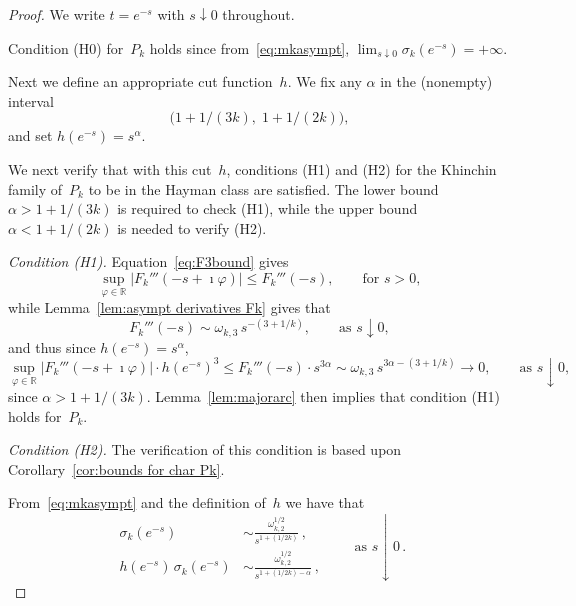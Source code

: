 \documentclass[12pt]{amsart}
\theoremstyle{definition}
\begin{document}
\begin{proof}
We write $t=e^{-s}$ with $s\downarrow 0$ throughout.

Condition (H0) for~$P_k$ holds since from~\eqref{eq:mkasympt}, $\lim_{s\downarrow 0}\sigma_k(e^{-s})=+\infty$.

Next we define an appropriate cut function~$h$. We fix any $\alpha$ in the (nonempty) interval
\begin{equation}\label{eq:alphainterval}
\big(1+1/(3k),\; 1+1/(2k)\big),
\end{equation}
and set $h(e^{-s})=s^{\alpha}$.
\smallskip

We next verify that with this cut~$h$, conditions (H1) and (H2) for the Khinchin family
of~$P_k$ to be in the Hayman class are satisfied. The lower bound  $\alpha > 1+1/(3k)$ is required
to check (H1), while the upper bound  $\alpha < 1+1/(2k)$ is needed to verify (H2).

\medskip

\noindent\textit{Condition \textup{(H1)}.} Equation~\eqref{eq:F3bound} gives
\begin{equation}\label{eq:F3boundbis}
\sup_{\varphi\in\mathbb{R}} \big|F_k'''(-s+\imath\varphi)\big| \le F_k'''(-s), \qquad \text{for } s>0,
\end{equation}
while Lemma~\ref{lem:asympt derivatives Fk} gives that
\[
F_k'''(-s) \sim \omega_{k,3}\, s^{-(3+1/k)}, \qquad \text{as } s\downarrow 0,
\]
and thus since $h(e^{-s})=s^{\alpha}$,
\begin{equation}\label{eq:F3boundtris}
\sup_{\varphi\in\mathbb{R}} \big|F_k'''(-s+\imath\varphi)\big| \cdot h(e^{-s})^3 \le F_k'''(-s)\cdot s^{3\alpha} \sim \omega_{k,3}\, s^{3\alpha-(3+1/k)} \to 0, \qquad \text{as } s\downarrow 0,
\end{equation}
since $\alpha > 1+1/(3k)$. Lemma~\ref{lem:majorarc} then implies that condition (H1) holds for~$P_k$.

\medskip

\noindent\textit{Condition \textup{(H2)}.} The verification of this condition is based upon Corollary~\ref{cor:bounds for char Pk}.

From~\eqref{eq:mkasympt} and the definition of~$h$ we have that
\begin{equation}\label{eq:sigmahasympt}
\begin{aligned}
\sigma_k(e^{-s}) &\sim \frac{\omega_{k,2}^{1/2}}{s^{1+(1/2k)}}\,,\\[4pt]
h(e^{-s})\,\sigma_k(e^{-s}) &\sim \frac{\omega_{k,2}^{1/2}}{s^{1+(1/2k)-\alpha}}\,,
\end{aligned}
\qquad \text{as } s\downarrow 0\,.
\end{equation}


\end{proof}
\end{document}
